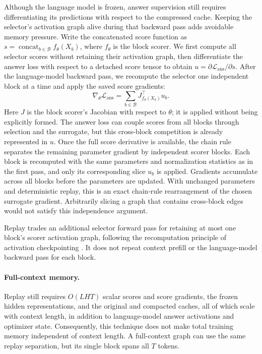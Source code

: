 Although the language model is frozen, answer supervision still requires differentiating its predictions with respect to the compressed cache. Keeping the selector's activation graph alive during that backward pass adds avoidable memory pressure. Write the concatenated score function as $s=\operatorname{concat}_{b\in\mathcal{B}}f_{\theta}(X_b)$, where $f_{\theta}$ is the block scorer. We first compute all selector scores without retaining their activation graph, then differentiate the answer loss with respect to a detached score tensor to obtain $u=\partial\mathcal{L}_{\mathrm{ans}}/\partial s$. After the language-model backward pass, we recompute the selector one independent block at a time and apply the saved score gradients:
\begin{equation}
    \nabla_{\theta}\mathcal{L}_{\mathrm{ans}}
    =\sum_{b\in\mathcal{B}}
    J_{f_{\theta}(X_b)}^{\top}u_b.
    \label{eq:replay}
\end{equation}
Here $J$ is the block scorer's Jacobian with respect to $\theta$; it is applied without being explicitly formed. The answer loss can couple scores from all blocks through selection and the surrogate, but this cross-block competition is already represented in $u$. Once the full score derivative is available, the chain rule separates the remaining parameter gradient by independent scorer blocks. Each block is recomputed with the same parameters and normalization statistics as in the first pass, and only its corresponding slice $u_b$ is applied. Gradients accumulate across all blocks before the parameters are updated. With unchanged parameters and deterministic replay, this is an exact chain-rule rearrangement of the chosen surrogate gradient. Arbitrarily slicing a graph that contains cross-block edges would not satisfy this independence argument.

Replay trades an additional selector forward pass for retaining at most one block's scorer activation graph, following the recomputation principle of activation checkpointing \citep{chen2016checkpointing}. It does not repeat context prefill or the language-model backward pass for each block.

\paragraph{Full-context memory.}
Replay still requires $O(LHT)$ scalar scores and score gradients, the frozen hidden representations, and the original and compacted caches, all of which scale with context length, in addition to language-model answer activations and optimizer state. Consequently, this technique does not make total training memory independent of context length. A full-context graph can use the same replay separation, but its single block spans all $T$ tokens.


